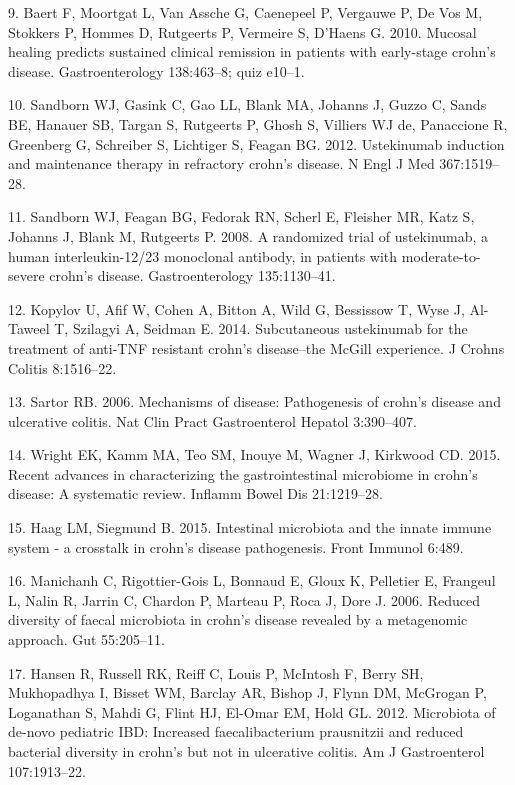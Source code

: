 \documentclass[11pt,]{article}
\begin{document}
\hypertarget{ref-baert_mucosalhealing_2010}{}
9. Baert F, Moortgat L, Van Assche G, Caenepeel P, Vergauwe P, De Vos M,
Stokkers P, Hommes D, Rutgeerts P, Vermeire S, D'Haens G. 2010. Mucosal
healing predicts sustained clinical remission in patients with
early-stage crohn's disease. Gastroenterology 138:463--8; quiz e10--1.

\hypertarget{ref-sandborn_ust_2012}{}
10. Sandborn WJ, Gasink C, Gao LL, Blank MA, Johanns J, Guzzo C, Sands
BE, Hanauer SB, Targan S, Rutgeerts P, Ghosh S, Villiers WJ de,
Panaccione R, Greenberg G, Schreiber S, Lichtiger S, Feagan BG. 2012.
Ustekinumab induction and maintenance therapy in refractory crohn's
disease. N Engl J Med 367:1519--28.

\hypertarget{ref-sandborn_ust_2008}{}
11. Sandborn WJ, Feagan BG, Fedorak RN, Scherl E, Fleisher MR, Katz S,
Johanns J, Blank M, Rutgeerts P. 2008. A randomized trial of
ustekinumab, a human interleukin-12/23 monoclonal antibody, in patients
with moderate-to-severe crohn's disease. Gastroenterology 135:1130--41.

\hypertarget{ref-kopylov_ust_2014}{}
12. Kopylov U, Afif W, Cohen A, Bitton A, Wild G, Bessissow T, Wyse J,
Al-Taweel T, Szilagyi A, Seidman E. 2014. Subcutaneous ustekinumab for
the treatment of anti-TNF resistant crohn's disease--the McGill
experience. J Crohns Colitis 8:1516--22.

\hypertarget{ref-sartor_IBDpath_2006}{}
13. Sartor RB. 2006. Mechanisms of disease: Pathogenesis of crohn's
disease and ulcerative colitis. Nat Clin Pract Gastroenterol Hepatol
3:390--407.

\hypertarget{ref-wright_CDmicrobiome_2015}{}
14. Wright EK, Kamm MA, Teo SM, Inouye M, Wagner J, Kirkwood CD. 2015.
Recent advances in characterizing the gastrointestinal microbiome in
crohn's disease: A systematic review. Inflamm Bowel Dis 21:1219--28.

\hypertarget{ref-haag_CDpath_2015}{}
15. Haag LM, Siegmund B. 2015. Intestinal microbiota and the innate
immune system - a crosstalk in crohn's disease pathogenesis. Front
Immunol 6:489.

\hypertarget{ref-manichanh_diversityCD_2006}{}
16. Manichanh C, Rigottier-Gois L, Bonnaud E, Gloux K, Pelletier E,
Frangeul L, Nalin R, Jarrin C, Chardon P, Marteau P, Roca J, Dore J.
2006. Reduced diversity of faecal microbiota in crohn's disease revealed
by a metagenomic approach. Gut 55:205--11.

\hypertarget{ref-hansen_pedsIBD_2012}{}
17. Hansen R, Russell RK, Reiff C, Louis P, McIntosh F, Berry SH,
Mukhopadhya I, Bisset WM, Barclay AR, Bishop J, Flynn DM, McGrogan P,
Loganathan S, Mahdi G, Flint HJ, El-Omar EM, Hold GL. 2012. Microbiota
of de-novo pediatric IBD: Increased faecalibacterium prausnitzii and
reduced bacterial diversity in crohn's but not in ulcerative colitis. Am
J Gastroenterol 107:1913--22.
\end{document}
